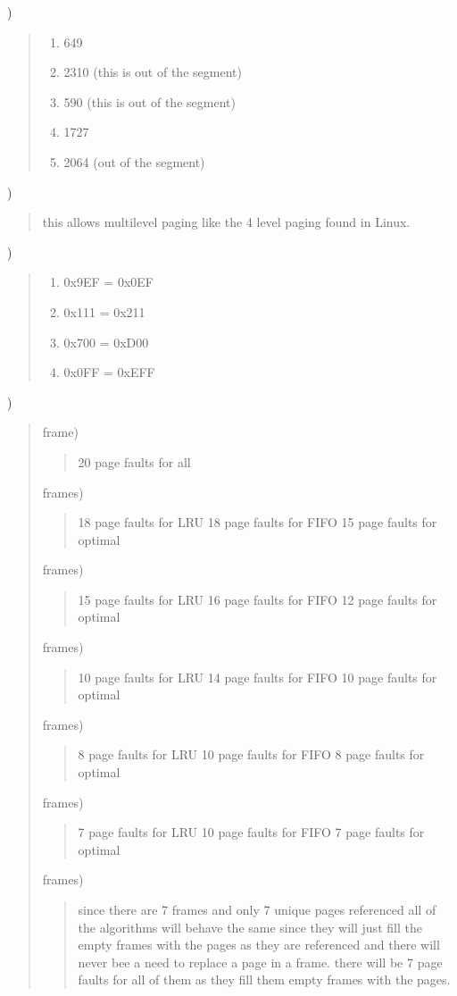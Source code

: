 \documentclass[11pt]{article}
\newenvironment{subquestion}[1]{#1) \begin{quote}}{\end{quote}}
\begin{document}
  \begin{subquestion}{8.28}
    \begin{enumerate}[label=(\alph*)]
      \item 649
      \item 2310 (this is out of the segment)
      \item 590 (this is out of the segment)
      \item 1727
      \item 2064 (out of the segment)
    \end{enumerate}
  \end{subquestion}

  \begin{subquestion}{8.29}
    this allows multilevel paging like the 4 level paging found in Linux.
  \end{subquestion}

  \begin{subquestion}{9.3}
    \begin{enumerate}
      \item 0x9EF = 0x0EF
      \item 0x111 = 0x211
      \item 0x700 = 0xD00
      \item 0x0FF = 0xEFF
    \end{enumerate}
  \end{subquestion}

  \begin{subquestion}{9.8}
    \begin{subquestion}{1 frame}
      20 page faults for all
    \end{subquestion}
    \begin{subquestion}{2 frames}
      18 page faults for LRU
      18 page faults for FIFO
      15 page faults for optimal
    \end{subquestion}
    \begin{subquestion}{3 frames}
      15 page faults for LRU
      16 page faults for FIFO
      12 page faults for optimal
    \end{subquestion}
    \begin{subquestion}{4 frames}
      10 page faults for LRU
      14 page faults for FIFO
      10 page faults for optimal
    \end{subquestion}
    \begin{subquestion}{5 frames}
      8 page faults for LRU
      10 page faults for FIFO
      8 page faults for optimal
    \end{subquestion}
    \begin{subquestion}{6 frames}
      7 page faults for LRU
      10 page faults for FIFO
      7 page faults for optimal
    \end{subquestion}
    \begin{subquestion}{7 frames}
      since there are 7 frames and only 7 unique pages referenced all of the algorithms will behave the same
      since they will just fill the empty frames with the pages as they are referenced and there will
      never bee a need to replace a page in a frame. there will be 7 page faults for all of them as they
      fill them empty frames with the pages.
    \end{subquestion}
  \end{subquestion}
\end{document}
